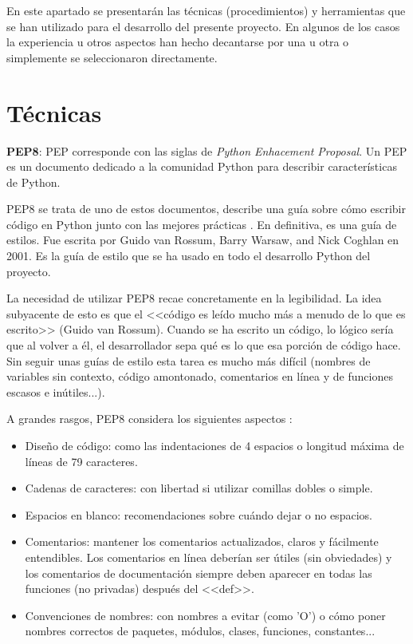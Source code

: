 
En este apartado se presentarán las técnicas (procedimientos) y herramientas que
se han utilizado para el desarrollo del presente proyecto. En algunos de los
casos la experiencia u otros aspectos han hecho decantarse por una u otra o
simplemente se seleccionaron directamente.

\section{Técnicas}

\textbf{PEP8}: PEP corresponde con las siglas de \textit{Python Enhacement
Proposal}. Un PEP es un documento dedicado a la comunidad Python para describir
características de Python.

PEP8 se trata de uno de estos documentos, describe una guía sobre cómo escribir
código en Python junto con las mejores prácticas \cite{pep8:desc}. En
definitiva, es una guía de estilos. Fue escrita por Guido van Rossum, Barry
Warsaw, and Nick Coghlan en 2001. Es la guía de estilo que se ha usado en todo
el desarrollo Python del proyecto.

La necesidad de utilizar PEP8 recae concretamente en la legibilidad. La idea
subyacente de esto es que el <<código es leído mucho más a menudo de lo que es
escrito>> (Guido van Rossum). Cuando se ha escrito un código, lo lógico sería
que al volver a él, el desarrollador sepa qué es lo que esa porción de código
hace. Sin seguir unas guías de estilo esta tarea es mucho más difícil (nombres
de variables sin contexto, código amontonado, comentarios en línea y de
funciones escasos e inútiles...).

A grandes rasgos, PEP8 considera los siguientes aspectos \cite{pep8}:

\begin{itemize}
	\item Diseño de código: como las indentaciones de 4 espacios o longitud
	máxima de líneas de 79 caracteres.
	\item Cadenas de caracteres: con libertad si utilizar comillas dobles o
	simple.
	\item Espacios en blanco: recomendaciones sobre cuándo dejar o no espacios.
	\item Comentarios: mantener los comentarios actualizados, claros y
	fácilmente entendibles. Los comentarios en línea deberían ser útiles (sin
	obviedades) y los comentarios de documentación siempre deben aparecer en
	todas las funciones (no privadas) después del <<def>>.
	\item Convenciones de nombres: con nombres a evitar (como 'O') o cómo poner
	nombres correctos de paquetes, módulos, clases, funciones, constantes...
\end{itemize}

